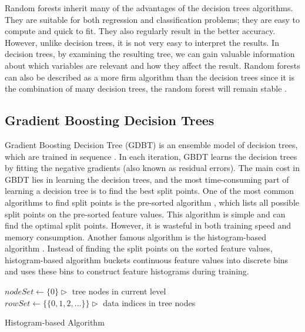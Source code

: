 Random forests inherit many of the advantages of the decision trees algorithms. They are suitable for both regression and classification problems; they are easy to compute and quick to fit. They also regularly result in the better accuracy. However, unlike decision trees, it is not very easy to interpret the results. In decision trees, by examining the resulting tree, we can gain valuable information about which variables are relevant and how they affect the result. Random forests can also be described as a more firm algorithm than the decision trees since it is the combination of many decision trees, the random forest will remain stable \cite{louppe2014understanding}.

\subsection{Gradient Boosting Decision Trees}
\label{ssec:gbdt}

Gradient Boosting Decision Tree (GDBT) is an ensemble model of decision trees, which are trained in sequence \cite{friedman2001greedy}. In each iteration, GBDT learns the decision trees by fitting the negative gradients (also known as residual errors). The main cost in GBDT lies in learning the decision trees, and the most time-consuming part of learning a decision tree is to find the best split points. One of the most common algorithms to find split points is the pre-sorted algorithm \cite{mehta1996sliq, shafer1996sprint}, which lists all possible split points on the pre-sorted feature values. This algorithm is simple and can find the optimal split points. However, it is wasteful in both training speed and memory consumption. Another famous algorithm is the histogram-based
algorithm \cite{ranka1998clouds, jin2003communication, li2008mcrank}. Instead of finding the split points on the sorted feature values, histogram-based algorithm buckets continuous feature values into discrete bins and uses these bins to construct feature histograms during training.

\bigskip
\begin{algorithm}[H]
 $nodeSet \leftarrow \{0\} \triangleright$ tree nodes in current level \\
 $rowSet \leftarrow \{\{0, 1, 2, ...\}\} \triangleright$ data indices in tree nodes \\
 \caption{Histogram-based Algorithm}
 \label{alg:histogram-based}
\end{algorithm}
\bigskip

